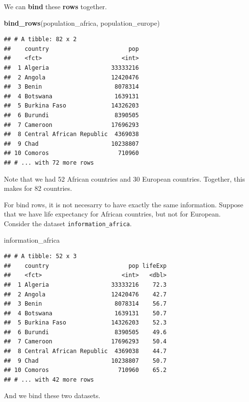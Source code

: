 \documentclass[]{tufte-book}
\newenvironment{Shaded}{}{}
\newcommand{\KeywordTok}[1]{\textcolor[rgb]{0.00,0.44,0.13}{\textbf{#1}}}
\newcommand{\NormalTok}[1]{#1}
\begin{document}
We can \textbf{bind} these \textbf{rows} together.

\begin{Shaded}
\begin{Highlighting}[]
\KeywordTok{bind_rows}\NormalTok{(population_africa, population_europe)}
\end{Highlighting}
\end{Shaded}

\begin{verbatim}
## # A tibble: 82 x 2
##    country                       pop
##    <fct>                       <int>
##  1 Algeria                  33333216
##  2 Angola                   12420476
##  3 Benin                     8078314
##  4 Botswana                  1639131
##  5 Burkina Faso             14326203
##  6 Burundi                   8390505
##  7 Cameroon                 17696293
##  8 Central African Republic  4369038
##  9 Chad                     10238807
## 10 Comoros                    710960
## # ... with 72 more rows
\end{verbatim}

Note that we had 52 African countries and 30 European countries. Together, this makes for 82 countries.

For bind rows, it is not necesarry to have exactly the same information. Suppose that we have life expectancy for African countries, but not for European. Consider the dataset \texttt{information\_africa}.

\begin{Shaded}
\begin{Highlighting}[]
\NormalTok{information_africa }
\end{Highlighting}
\end{Shaded}

\begin{verbatim}
## # A tibble: 52 x 3
##    country                       pop lifeExp
##    <fct>                       <int>   <dbl>
##  1 Algeria                  33333216    72.3
##  2 Angola                   12420476    42.7
##  3 Benin                     8078314    56.7
##  4 Botswana                  1639131    50.7
##  5 Burkina Faso             14326203    52.3
##  6 Burundi                   8390505    49.6
##  7 Cameroon                 17696293    50.4
##  8 Central African Republic  4369038    44.7
##  9 Chad                     10238807    50.7
## 10 Comoros                    710960    65.2
## # ... with 42 more rows
\end{verbatim}

And we bind these two datasets.
\end{document}
